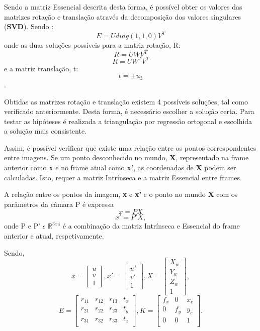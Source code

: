 Sendo a matriz Essencial descrita desta forma, é possível obter os valores das matrizes rotação e translação através da decomposição dos valores singulares (\textbf{SVD}). Sendo : \[ E = U diag(1,1,0) V^{T} \] onde as duas soluções possíveis para a matriz rotação, R: \[ R = UWV^T \] \[ R = UW^TV^T \] e a matriz translação, t: \[ t = \pm u_3 \].


Obtidas as matrizes rotação e translação existem 4 possíveis soluções, tal como verificado anteriormente. Desta forma, é necessário escolher a solução certa. Para testar as hipóteses é realizada a triangulação por regressão ortogonal e escolhida a solução mais consistente.

Assim, é possível verificar que existe uma relação entre os pontos correspondentes entre imagens. Se um ponto desconhecido no mundo, \textbf{X}, representado na frame anterior como \textbf{x} e no frame atual como \textbf{x'}, as coordenadas de \textbf{X} podem ser calculadas. Isto, requer a matriz Intrínseca e a matriz Essencial entre frames.

A relação entre os pontos da imagem, \textbf{x} e \textbf{x'} e o ponto no mundo \textbf{X} com os parâmetros da câmara P é expressa \[ x = P X \] \[ x' = P'X, \] onde P e P' $\epsilon$  $\mathbb{R}^{3x4}$ é a combinação da matriz Intrínseca e Essencial do frame anterior e atual, respetivamente.

Sendo, \[ x =  \left[ \begin{array}{ccc} u \\ v \\ 1 \end{array} \right],  x' =  \left[ \begin{array}{ccc} u' \\ v' \\ 1 \end{array} \right],  X =  \left[ \begin{array}{cccc} X_w \\ Y_w \\ Z_w \\ 1 \end{array} \right], \] \[ E =  \left[ \begin{array}{cccc} r_{11} & r_{12} & r_{13} & t_{x} \\ r_{21} & r_{22} & r_{23} & t_{y} \\ r_{31} & r_{32} & r_{33} & t_{z} \\ \end{array} \right], K =  \left[ \begin{array}{ccc} f_x & 0 & x_c \\ 0 & f_y & y_c \\ 0 & 0 & 1 \\ \end{array} \right]. \]

